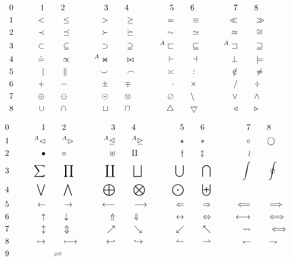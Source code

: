 \documentclass[a4paper]{report}
\begin{document}
\begin{displaymath}
\begin{aligned}
& 0 \qquad& 1 \qquad& 2 \qquad& 3 \qquad& 4 \qquad& 5 \qquad& 6 \qquad& 7 \qquad& 8\\
& 1 \qquad& < \qquad& \le \qquad& > \qquad& \ge \qquad& = \qquad& \equiv \qquad& \ll
\qquad& \gg\\
& 2 \qquad& \prec \qquad& \preceq \qquad& \succ \qquad& \succeq \qquad& \sim \qquad&
\simeq \qquad& \approx \qquad& \cong\\
& 3 \qquad& \subset \qquad& \subseteq \qquad& \supset \qquad& \supseteq \qquad&
{}^A\sqsubset \qquad& \sqsubseteq \qquad& {}^A\sqsupset \qquad& \sqsupseteq\\
& 4 \qquad& \doteq \qquad& \propto \qquad& {}^A\Join \qquad& \bowtie \qquad& \vdash
\qquad& \dashv \qquad& \perp \qquad& \models\\
& 5 \qquad& \mid \qquad& \parallel \qquad& \smile \qquad& \frown \qquad& \asymp
\qquad& : \qquad& \notin \qquad& \neq\\
& 6 \qquad& + \qquad& - \qquad& \pm \qquad& \mp \qquad& \cdot \qquad& \times \qquad& /
\qquad& \div \qquad& \\
& 7 \qquad& \oplus \qquad& \ominus \qquad& \odot \qquad& \otimes \qquad& \oslash
\qquad& \setminus \qquad& \lor \qquad& \land\\
& 8 \qquad& \cup \qquad& \cap \qquad& \sqcup \qquad& \sqcap \qquad& \bigtriangleup
\qquad& \bigtriangledown \qquad& \triangleleft \qquad& \triangleright
\end{aligned}
\end{displaymath}

\begin{displaymath}
\begin{aligned}
& 0 \qquad& 1 \qquad& 2 \qquad& 3 \qquad& 4 \qquad& 5 \qquad& 6 \qquad& 7 \qquad& 8\\
& 1 \qquad& {}^A\lhd \qquad& {}^A\rhd \qquad& {}^A\unlhd \qquad& {}^A\unrhd \qquad&
\star \qquad& \ast \qquad& \circ \qquad& \bigcirc\\
& 2 \qquad& \bullet \qquad& \diamond \qquad& \uplus \qquad& \amalg \qquad& \dagger
\qquad& \ddagger \qquad& \wr \qquad& {}\\
& 3 \qquad& \sum \qquad& \prod \qquad& \coprod \qquad& \bigsqcup \qquad& \bigcup
\qquad& \bigcap \qquad& \int \qquad& \oint\\
& 4 \qquad& \bigvee \qquad& \bigwedge \qquad& \bigoplus \qquad& \bigotimes \qquad&
\bigodot \qquad& \biguplus\\
& 5 \qquad& \gets \qquad& \to \qquad& \longleftarrow \qquad& \longrightarrow
\qquad& \Leftarrow \qquad& \Rightarrow \qquad& \Longleftarrow \qquad&
\Longrightarrow\\
& 6 \qquad& \uparrow \qquad& \downarrow \qquad& \Uparrow \qquad& \Downarrow \qquad&
\leftrightarrow \qquad& \Leftrightarrow \qquad& \longleftrightarrow \qquad&
\Longleftrightarrow\\
& 7 \qquad& \updownarrow \qquad& \Updownarrow \qquad& \nearrow \qquad& \searrow
\qquad& \swarrow \qquad& \nwarrow \qquad& \leadsto \qquad& \iff\\
& 8 \qquad& \mapsto \qquad& \longmapsto \qquad& \hookleftarrow \qquad&
\hookrightarrow \qquad& \leftharpoonup \qquad& \rightharpoonup \qquad&
\leftharpoondown \qquad& \rightharpoondown\\
& 9 \qquad& \rightleftharpoons
\end{aligned}
\end{displaymath}
\end{document}
